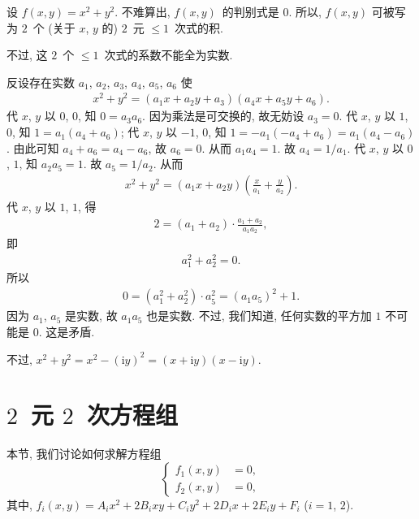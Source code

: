 \documentclass[../libro.tex]{subfiles}
\begin{document}
\begin{example}
    设 \(f(x, y) = x^2 + y^2\).
    不难算出, \(f(x, y)\)~的判别式是 \(0\).
    所以, \(f(x, y)\) 可被写为%
    \(2\)~个 (关于 \(x\), \(y\) 的)
    \(2\)~元 \({\leq} 1\)~次式的积.

    不过, 这 \(2\)~个 \({\leq} 1\)~次式的系数不能全为实数.

    反设存在实数
    \(a_1\), \(a_2\), \(a_3\), \(a_4\), \(a_5\), \(a_6\) 使
    \begin{align*}
        x^2 + y^2 = (a_1 x + a_2 y + a_3) (a_4 x + a_5 y + a_6).
    \end{align*}
    代 \(x\), \(y\) 以 \(0\), \(0\), 知 \(0 = a_3 a_6\).
    因为乘法是可交换的, 故无妨设 \(a_3 = 0\).
    代 \(x\), \(y\) 以 \(1\), \(0\), 知
    \(1 = a_1 (a_4 + a_6)\);
    代 \(x\), \(y\) 以 \(-1\), \(0\), 知
    \(1 = -a_1 (-a_4 + a_6) = a_1 (a_4 - a_6)\).
    由此可知 \(a_4 + a_6 = a_4 - a_6\),
    故 \(a_6 = 0\).
    从而 \(a_1 a_4 = 1\).
    故 \(a_4 = 1/a_1\).
    代 \(x\), \(y\) 以 \(0\), \(1\), 知 \(a_2 a_5 = 1\).
    故 \(a_5 = 1/a_2\).
    从而
    \begin{align*}
        x^2 + y^2 = (a_1 x + a_2 y)
        \left( \frac{x}{a_1} + \frac{y}{a_2} \right).
    \end{align*}
    代 \(x\), \(y\) 以 \(1\), \(1\), 得
    \begin{align*}
        2 = (a_1 + a_2) \cdot \frac{a_1 + a_2}{a_1 a_2},
    \end{align*}
    即
    \begin{align*}
        a_1^2 + a_2^2 = 0.
    \end{align*}
    所以
    \begin{align*}
        0
        = (a_1^2 + a_2^2) \cdot a_5^2
        = (a_1 a_5)^2 + 1.
    \end{align*}
    因为 \(a_1\), \(a_5\) 是实数, 故 \(a_1 a_5\) 也是实数.
    不过, 我们知道,
    任何实数的平方加 \(1\) 不可能是 \(0\).
    这是矛盾.

    不过,
    \(x^2 + y^2
        = x^2 - (\mathrm{i} y)^2
    = (x + \mathrm{i} y) (x - \mathrm{i} y)\).
\end{example}

\section{\texorpdfstring{\(2\)~元 \(2\)~次方程组}%
{2 元 2 次方程组}}

本节, 我们讨论如何求解方程组
\begin{equation}
    \left\{ %
    \begin{aligned}
        f_1 (x, y) & = 0, \\
        f_2 (x, y) & = 0,
    \end{aligned}
    \right. %
    \label{eq:A0301}
\end{equation}
其中, \(f_i (x, y) = A_i x^2 + 2B_i xy + C_i y^2
+ 2D_i x + 2E_i y + F_i\)
(\(i = 1\), \(2\)).
\end{document}
